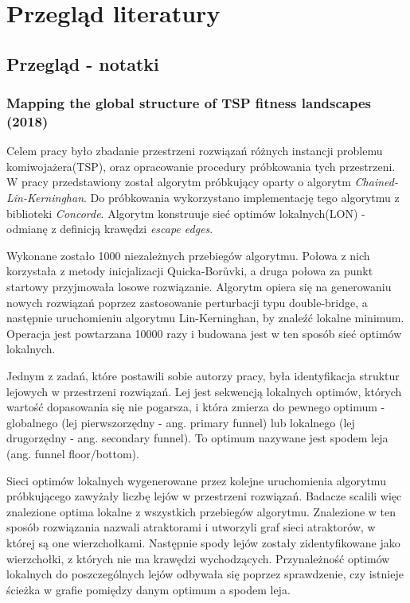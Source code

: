 \chapter{Przegląd literatury}
\section{Przegląd - notatki}

\subsection*{Mapping the global structure of TSP fitness landscapes (2018) \cite{DBLP:journals/heuristics/OchoaV18}}
Celem pracy było zbadanie przestrzeni rozwiązań różnych instancji problemu komiwojażera(TSP), oraz opracowanie
procedury próbkowania tych przestrzeni.
W pracy przedstawiony został algorytm próbkujący oparty o algorytm \textit{Chained-Lin-Kerninghan}.
Do próbkowania wykorzystano implementację tego algorytmu z biblioteki \textit{Concorde}.
Algorytm konstruuje sieć optimów lokalnych(LON) - odmianę z definicją krawędzi \textit{escape edges}.

Wykonane zostało 1000 niezależnych przebiegów algorytmu.
Połowa z nich korzystała z metody inicjalizacji Quicka-Borůvki, a druga połowa za punkt startowy przyjmowała losowe rozwiązanie.
Algorytm opiera się na generowaniu nowych rozwiązań poprzez zastosowanie perturbacji typu double-bridge,
a następnie uruchomieniu algorytmu Lin-Kerninghan, by znaleźć lokalne minimum.
Operacja jest powtarzana 10000 razy i budowana jest w ten sposób sieć optimów lokalnych.

Jednym z zadań, które postawili sobie autorzy pracy, była identyfikacja struktur lejowych w przestrzeni rozwiązań.
Lej jest sekwencją lokalnych optimów, których wartość dopasowania się nie pogarsza,
i która zmierza do pewnego optimum - globalnego (lej pierwszorzędny - ang. primary funnel) lub lokalnego (lej drugorzędny - ang. secondary funnel).
To optimum nazywane jest spodem leja (ang. funnel floor/bottom).

Sieci optimów lokalnych wygenerowane przez kolejne uruchomienia algorytmu próbkującego zawyżały liczbę lejów w przestrzeni rozwiązań.
Badacze scalili więc znalezione optima lokalne z wszystkich przebiegów algorytmu.
Znalezione w ten sposób rozwiązania nazwali atraktorami i utworzyli graf sieci atraktorów, w której są one wierzchołkami.
Następnie spody lejów zostały zidentyfikowane jako wierzchołki, z których nie ma krawędzi wychodzących.
Przynależność optimów lokalnych do poszczególnych lejów odbywała się poprzez sprawdzenie,
czy istnieje ścieżka w grafie pomiędzy danym optimum a spodem leja.

